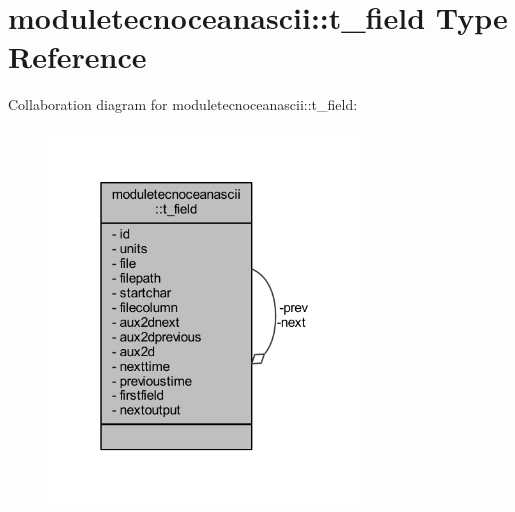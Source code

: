 \hypertarget{structmoduletecnoceanascii_1_1t__field}{}\section{moduletecnoceanascii\+:\+:t\+\_\+field Type Reference}
\label{structmoduletecnoceanascii_1_1t__field}


Collaboration diagram for moduletecnoceanascii\+:\+:t\+\_\+field\+:\nopagebreak
\begin{figure}[H]
\begin{center}
\leavevmode
\includegraphics[width=235pt]{structmoduletecnoceanascii_1_1t__field__coll__graph}
\end{center}
\end{figure}
